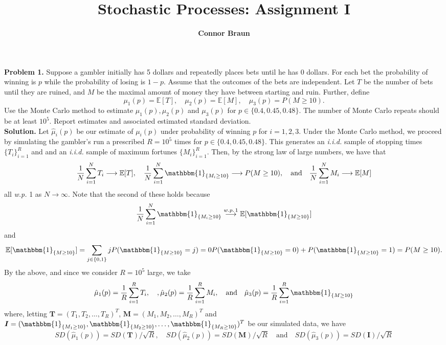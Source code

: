 \documentclass[11pt, letterpaper]{article}
\title{\bf Stochastic Processes: Assignment I}
\author{\bf Connor Braun}
\date{}
\newcommand{\bs}[1]{\boldsymbol{#1}}
\newcommand{\mbb}[1]{\mathbb{#1}}
\begin{document}
    \maketitle
    {\noindent \bf Problem 1.} Suppose a gambler initially has 5 dollars and repeatedly places bets until he has 0 dollars. For each bet the probability
    of winning is $p$ while the probability of losing is $1-p$. Assume that the outcomes of the bets are independent. Let $T$ be
    the number of bets until they are ruined, and $M$ be the maximal amount of money they have between starting and ruin. Further, define
    \[\mu_1(p)=\mbb{E}[T],\quad\mu_2(p)=\mbb{E}[M],\quad\mu_3(p)=P(M\geq 10).\]
    Use the Monte Carlo method to estimate $\mu_1(p), \mu_2(p)$ and $\mu_3(p)$ for $p\in\{0.4, 0.45, 0.48\}$. The number of Monte Carlo repeats should
    be at least $10^5$. Report estimates and associated estimated standard deviation.\\[10pt]
    {\bf Solution.} Let $\hat{\mu}_i(p)$ be our estimate of $\mu_i(p)$ under probability of winning $p$ for $i=1,2,3$. Under the Monte Carlo method,
    we proceed by simulating the gambler's run a prescribed $R=10^5$ times for $p\in\{0.4, 0.45, 0.48\}$. This generates an {\it i.i.d.} sample of stopping times $\{T_i\}_{i=1}^R$ and 
    and an {\it i.i.d.} sample of maximum fortunes $\{M_i\}_{i=1}^R$. Then, by the strong law of large numbers, we have that 
    \[\frac{1}{N}\sum_{i=1}^NT_i\longrightarrow \mbb{E}[T],\quad\frac{1}{N}\sum_{i=1}^N\mathbbm{1}_{\{M_i\geq 10\}}\longrightarrow P(M\geq 10),\quad \text{and}\quad\frac{1}{N}\sum_{i=1}^N M_i\longrightarrow\mbb{E}[M]\]
    all {\it w.p.} 1 as $N\rightarrow\infty$. Note that the second of these holds because
    \[\frac{1}{N}\sum_{i=1}^N\mathbbm{1}_{\{M_i\geq 10\}}\overset{w.p.\,1}{\longrightarrow}\mbb{E}[\mathbbm{1}_{\{M\geq 10\}}]\]
    and
    \[\mbb{E}[\mathbbm{1}_{\{M\geq 10\}}]=\sum_{j\in\{0, 1\}}jP(\mathbbm{1}_{\{M\geq 10\}} = j)=0P(\mathbbm{1}_{\{M\geq 10\}} = 0)+P(\mathbbm{1}_{\{M\geq 10\}}=1)=P(M\geq 10).\]
    By the above, and since we consider $R=10^5$ large, we take
    \[\hat{\mu}_1(p)=\frac{1}{R}\sum_{i=1}^RT_i,\quad,\hat{\mu}_2(p)=\frac{1}{R}\sum_{i=1}^RM_i,\quad\text{and}\quad\hat{\mu}_3(p)=\frac{1}{R}\sum_{i=1}^R\mathbbm{1}_{\{M\geq 10\}}\]
    where, letting $\bs{T}=(T_1,T_2,\dots,T_R)^T$, $\bs{M}=(M_1,M_2,\dots,M_R)^T$ and $\bs{I}=(\mathbbm{1}_{\{M_1\geq 10\}},\mathbbm{1}_{\{M_2\geq 10\}},\dots,\mathbbm{1}_{\{M_R\geq 10\}})^T$ be our simulated data, we have
    \[SD(\hat{\mu}_1(p))=SD(\bs{T})/\sqrt{R},\quad SD(\hat{\mu}_2(p))=SD(\bs{M})/\sqrt{R}\quad\text{and}\quad SD(\hat{\mu}_3(p))=SD(\bs{I})/\sqrt{R}\]
\end{document}
